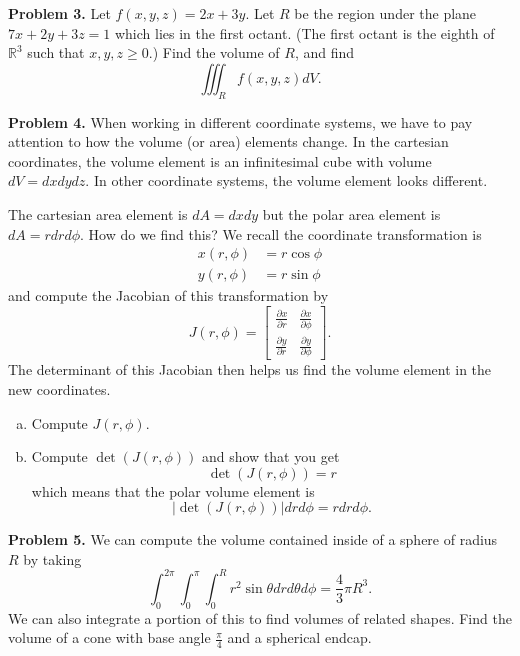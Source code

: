 \documentclass[12pt]{report} %
\newcommand{\R}{\mathbb{R}}
\theoremstyle{definition}
\begin{document}
\noindent\textbf{Problem 3.} Let $f(x,y,z)=2x+3y$. Let $R$ be the region under the plane $7x+2y+3z=1$ which lies in the first octant. (The first octant is the eighth of $\R^3$ such that $x,y,z\geq 0$.) Find the volume of $R$, and find
\[
\iiint_{R} f(x,y,z)dV.
\]
\vspace*{.5cm}

\noindent\textbf{Problem 4.} When working in different coordinate systems, we have to pay attention to how the volume (or area) elements change.  In the cartesian coordinates, the volume element is an infinitesimal cube with volume $dV=dxdydz$.  In other coordinate systems, the volume element looks different.  

The cartesian area element is $dA=dxdy$ but the polar area element is $dA=rdrd\phi$. How do we find this? We recall the coordinate transformation is
    \begin{align*}
        x(r,\phi)&=r\cos \phi\\
        y(r,\phi)&=r\sin \phi
    \end{align*}
    and compute the Jacobian of this transformation by
    \[
    J(r,\phi)=\begin{bmatrix} \frac{\partial x}{\partial r} & \frac{\partial x}{\partial \phi} \\ \frac{\partial y}{\partial r} & \frac{\partial y}{\partial \phi}\end{bmatrix}.
    \]
    The determinant of this Jacobian then helps us find the volume element in the new coordinates.
\begin{enumerate}[(a)]
    \item Compute $J(r,\phi)$.
    \item Compute $\det(J(r,\phi))$ and show that you get 
    \[
    \det(J(r,\phi))=r
    \]
    which means that the polar volume element is
    \[
    |\det(J(r,\phi))|drd\phi = rdrd\phi.
    \]
\end{enumerate}
\vspace*{.5cm}

\noindent\textbf{Problem 5.} We can compute the volume contained inside of a sphere of radius $R$ by taking
\[
\int_0^{2\pi} \int_0^\pi \int_0^R r^2 \sin \theta dr d\theta d\phi = \frac{4}{3}\pi R^3.
\]
We can also integrate a portion of this to find volumes of related shapes. Find the volume of a cone with base angle $\frac{\pi}{4}$ and a spherical endcap. 
\end{document}
